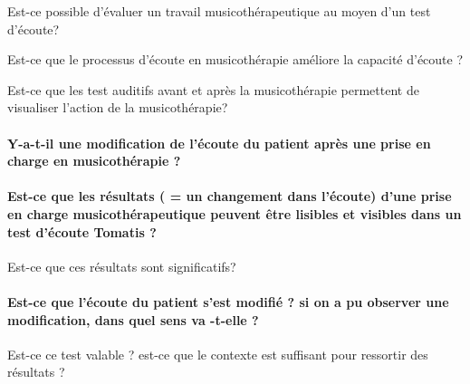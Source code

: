 Est-ce possible d'évaluer un travail musicothérapeutique au moyen
d'un test d'écoute?

Est-ce que le processus d'écoute en musicothérapie améliore la capacité
d'écoute ?

Est-ce que les test auditifs avant et après la musicothérapie permettent
de visualiser l'action de la musicothérapie?

\paragraph{Y-a-t-il une modification de l'écoute du patient après une prise
en charge en musicothérapie ?}

\paragraph{Est-ce que les résultats ( = un changement dans l'écoute) d'une prise
en charge musicothérapeutique peuvent être lisibles et visibles dans
un test d'écoute Tomatis ?}

Est-ce que ces résultats sont significatifs? 

\paragraph{Est-ce que l'écoute du patient s'est modifié ? si on a pu observer
une modification, dans quel sens va -t-elle ?}

Est-ce ce test valable ? est-ce que le contexte est suffisant pour
ressortir des résultats ?





